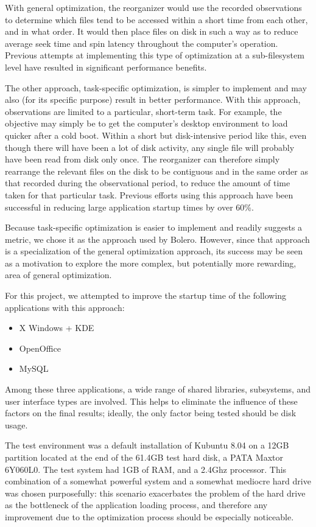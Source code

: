 \documentclass[10pt,twocolumn,letterpaper]{article}
\begin{document}
With general optimization, the reorganizer would use the recorded observations
to determine which files tend to be accessed within a short time from each
other, and in what order. It would then place files on disk in such a way as
to reduce average seek time and spin latency throughout the computer's operation.
Previous attempts at implementing this type of optimization at a
sub-filesystem level have resulted in significant performance benefits\cite{autolocality}.

The other approach, task-specific optimization, is simpler to
implement and may also (for its specific purpose) result in better performance. With this
approach, observations are limited to a particular, short-term task. For example,
the objective may simply be to get the computer's desktop environment to load
quicker after a cold boot. Within a short but disk-intensive period like this, even
though there will have been a lot of disk activity, any single file will
probably have been read from disk only once. The reorganizer can therefore simply
rearrange the relevant files on the disk to be contiguous and in the same order as that
recorded during the observational period, to reduce the amount of time taken for
that particular task. Previous efforts using this approach have been
successful in reducing large application startup times by over 60\%\cite{ala}.

Because task-specific optimization is easier to implement and readily suggests
a metric, we chose it as the approach used by Bolero. However, since that approach is a
specialization of the general optimization approach, its success may be seen
as a motivation to explore the more complex, but potentially more rewarding, area
of general optimization.

For this project, we attempted to improve the startup time of the following applications with this approach:
\begin{itemize}
\item X Windows + KDE
\item OpenOffice
\item MySQL
\end{itemize}
Among these three applications, a wide range of shared libraries, subsystems, and user interface types
are involved. This helps to eliminate the influence of these factors on the final results;
ideally, the only factor being tested should be disk usage.

The test environment was a default installation of Kubuntu 8.04 on a 12GB partition located
at the end of the 61.4GB test hard disk, a PATA Maxtor 6Y060L0. The test system had
1GB of RAM, and a 2.4Ghz processor. This combination of a somewhat powerful system and
a somewhat mediocre hard drive was chosen purposefully: this scenario exacerbates the
problem of the hard drive as the bottleneck of the application loading process, and therefore
any improvement due to the optimization process should be especially noticeable.
\end{document}

